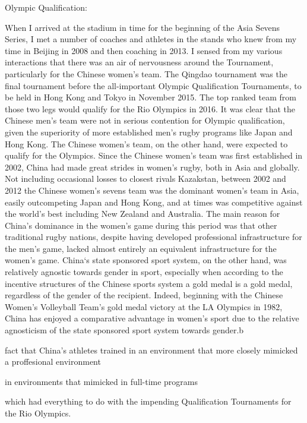 Olympic Qualification:

When I arrived at the stadium in time for the beginning of the Asia Sevens Series, I met a number of coaches and athletes in the stands who knew from my time in Beijing in 2008 and then coaching in 2013. I sensed from my various interactions that there was an air of nervousness around the Tournament, particularly for the Chinese women's team.   The Qingdao tournament was the final tournament before the all-important Olympic Qualification Tournaments, to be held in Hong Kong and Tokyo in November 2015.  The top ranked team from those two legs would qualify for the Rio Olympics in 2016. It was clear that the Chinese men's team were not in serious contention for Olympic qualification, given the superiority of more established men's rugby programs like Japan and Hong Kong. The Chinese women's team, on the other hand, were expected to qualify for the Olympics. Since the Chinese women's team was first established in 2002, China had made great strides in women's rugby, both in Asia and globally.  Not including occasional losses to closest rivals Kazakstan, between 2002 and 2012 the Chinese women's sevens team was the dominant women's team in Asia, easily outcompeting Japan and Hong Kong, and at times was competitive against the world's best including New Zealand and Australia.  The main reason for China's dominance in the women's game during this period was that other traditional rugby nations, despite having developed professional infrastructure for the men's game, lacked almost entirely an equivalent infrastructure for the women's game. China`s state sponsored sport system, on the other hand, was relatively agnostic towards gender in sport, especially when according to the incentive structures of the Chinese sports system a gold medal is a gold medal, regardless of the gender of the recipient.
Indeed, beginning with the Chinese Women's Volleyball Team's gold medal victory at the LA Olympics in 1982, China has enjoyed a comparative advantage in women's sport due to the relative agnosticism of the state sponsored sport system towards gender.b







 fact that China's athletes trained in an environment that more closely mimicked a proffesional environment


 in environments that mimicked in full-time programs


 which had everything to do with the impending Qualification Tournaments for the Rio Olympics.


